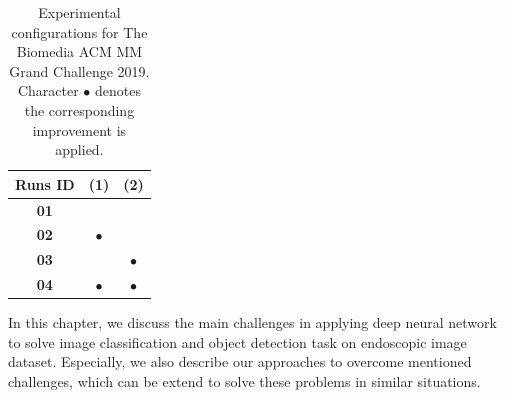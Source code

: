\begin{table}[h]
\centering
\caption{Experimental configurations for The Biomedia ACM MM Grand Challenge 2019. Character $\bullet$ denotes the corresponding improvement is applied.}
\begin{tabular}{|c|c|c|}
\hline
\multicolumn{1}{|l|}{\textbf{Runs ID}} & \multicolumn{1}{l|}{\textbf{(1)}} & \multicolumn{1}{l|}{\textbf{(2)}} \\ \hline
\textbf{01}                            &                          &                          \\ \hline
\textbf{02}                            & $\bullet$                        &                          \\ \hline
\textbf{03}                            &                          & $\bullet$                        \\ \hline
\textbf{04}                            & $\bullet$                        & $\bullet$                        \\ \hline
\end{tabular}
\label{tab:biomedia_config}
\end{table}

\begin{ChapAbstract}
In this chapter, we discuss the main challenges in applying deep neural network to solve image classification and object detection task on endoscopic image dataset. Especially, we also describe our approaches to overcome mentioned challenges, which can be extend to solve these problems in similar situations.
\end{ChapAbstract}
